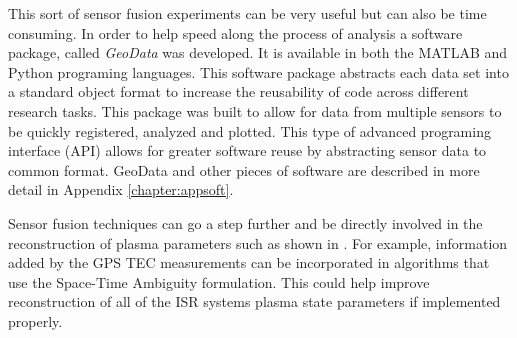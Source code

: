 This sort of sensor fusion experiments can be very useful but can also be time consuming. In order to help speed along the process of analysis a software package, called \textit{GeoData} was developed. It is available in both the MATLAB \citep{john_swoboda_2016_154536} 
and Python \citep{john_swoboda_2016_154533} programing languages. This software package abstracts each data set into a standard object format to increase the reusability of code across different research tasks. This package was built to allow for data from multiple sensors to be quickly registered, analyzed and plotted. This type of advanced programing interface (API) allows for greater software reuse by abstracting sensor data to common format. GeoData and other pieces of software are described in more detail in Appendix \ref{chapter:appsoft}.

Sensor fusion techniques can go a step further and be directly involved in the reconstruction of plasma parameters such as shown in \citet{Semeter:2016gm}. For example, information added by the GPS TEC measurements can be incorporated in algorithms that use the Space-Time Ambiguity formulation. This could help improve reconstruction of all of the ISR systems plasma state parameters if implemented properly.
